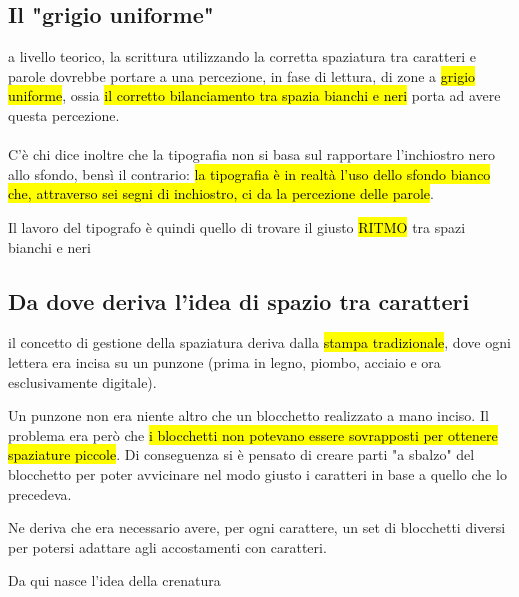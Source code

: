\subsection{Il "grigio uniforme"}
a livello teorico, la scrittura utilizzando la corretta spaziatura tra caratteri e parole dovrebbe portare a una percezione, in fase di lettura, di zone a \hl{grigio uniforme}, ossia \hl{il corretto bilanciamento tra spazia bianchi e neri} porta ad avere questa percezione.
\\\\
C'è chi dice inoltre che la tipografia non si basa sul rapportare l'inchiostro nero allo sfondo, bensì il contrario: \hl{la tipografia è in realtà l'uso dello sfondo bianco che, attraverso sei segni di inchiostro, ci da la percezione delle parole}.

Il lavoro del tipografo è quindi quello di trovare il giusto \hl{RITMO} tra spazi bianchi e neri

\subsection{Da dove deriva l'idea di spazio tra caratteri}
il concetto di gestione della spaziatura deriva dalla \hl{stampa tradizionale}, dove ogni lettera era incisa su un punzone (prima in legno, piombo, acciaio e ora esclusivamente digitale).

Un punzone non era niente altro che un blocchetto realizzato a mano inciso. Il problema era però che \hl{i blocchetti non potevano essere sovrapposti per ottenere spaziature piccole}. Di conseguenza si è pensato di creare parti "a sbalzo" del blocchetto per poter avvicinare nel modo giusto i caratteri in base a quello che lo precedeva.

Ne deriva che era necessario avere, per ogni carattere, un set di blocchetti diversi per potersi adattare agli accostamenti con caratteri.

Da qui nasce l'idea della crenatura

        